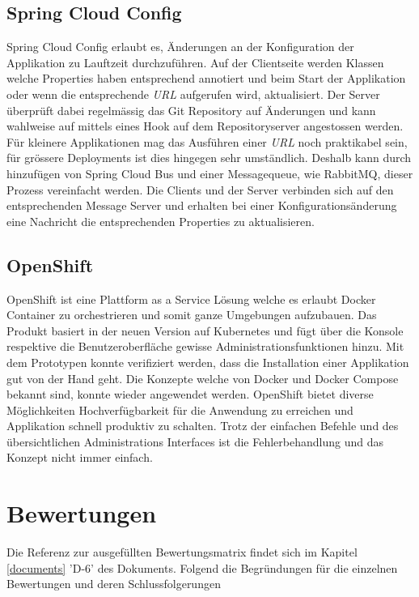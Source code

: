 \subsection{Spring Cloud Config}

Spring Cloud Config erlaubt es, Änderungen an der Konfiguration der Applikation zu Lauftzeit durchzuführen. Auf der Clientseite werden Klassen welche Properties haben entsprechend annotiert und beim Start der Applikation oder wenn die entsprechende \textit{\gls{URL}} aufgerufen wird, aktualisiert. Der Server überprüft dabei regelmässig das Git Repository auf Änderungen und kann wahlweise auf mittels eines Hook auf dem Repositoryserver angestossen werden. Für kleinere Applikationen mag das Ausführen einer \textit{\gls{URL}} noch praktikabel sein, für grössere Deployments ist dies hingegen sehr umständlich. Deshalb kann durch hinzufügen von Spring Cloud Bus und einer Messagequeue, wie RabbitMQ, dieser Prozess vereinfacht werden. Die Clients und der Server verbinden sich auf den entsprechenden Message Server und erhalten bei einer Konfigurationsänderung eine Nachricht die entsprechenden Properties zu aktualisieren.

\subsection{OpenShift}

OpenShift ist eine Plattform as a Service Lösung welche es erlaubt Docker Container zu orchestrieren und somit ganze Umgebungen aufzubauen. Das Produkt basiert in der neuen Version auf Kubernetes und fügt über die Konsole respektive die Benutzeroberfläche gewisse Administrationsfunktionen hinzu.  Mit dem Prototypen konnte verifiziert werden, dass die Installation einer Applikation gut von der Hand geht. Die Konzepte welche von Docker und Docker Compose bekannt sind, konnte wieder angewendet werden. OpenShift bietet diverse Möglichkeiten Hochverfügbarkeit für die Anwendung zu erreichen und Applikation schnell produktiv zu schalten. Trotz der einfachen Befehle und des übersichtlichen Administrations Interfaces ist die Fehlerbehandlung und das Konzept nicht immer einfach.

\section{Bewertungen}

Die Referenz zur ausgefüllten Bewertungsmatrix findet sich im Kapitel \ref{documents} 'D-6' des Dokuments. Folgend die Begründungen für die einzelnen Bewertungen und deren Schlussfolgerungen

